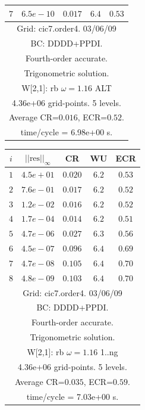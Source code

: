 \begin{table}[hbt]
\begin{center}
{\begin{tabular}{|c|c|c|c|c|}
 $ 7$  & $ 6.5e-10$ & $0.017$ & $ 6.4$ & $0.53$ \\ 
\hline 
\multicolumn{5}{|c|}{Grid: cic7.order4. 03/06/09}  \\
\multicolumn{5}{|c|}{BC: DDDD+PPDI.}  \\
\multicolumn{5}{|c|}{Fourth-order accurate.}  \\
\multicolumn{5}{|c|}{Trigonometric solution.}  \\
\multicolumn{5}{|c|}{W[2,1]: rb $\omega=1.16$ ALT}  \\
\multicolumn{5}{|c|}{4.36e+06 grid-points. 5 levels.}  \\
\multicolumn{5}{|c|}{Average CR=$0.016$, ECR=$0.52$.}  \\
\multicolumn{5}{|c|}{time/cycle = 6.98e+00 s.}  \\
\hline 
\end{tabular}
\begin{tabular}{|c|c|c|c|c|} \hline 
 $i$   & $\vert\vert\mbox{res}\vert\vert_\infty$  &  CR     &  WU    & ECR  \\   \hline 
 $ 1$  & $ 4.5e+01$ & $0.020$ & $ 6.2$ & $0.53$ \\ 
 $ 2$  & $ 7.6e-01$ & $0.017$ & $ 6.2$ & $0.52$ \\ 
 $ 3$  & $ 1.2e-02$ & $0.016$ & $ 6.2$ & $0.52$ \\ 
 $ 4$  & $ 1.7e-04$ & $0.014$ & $ 6.2$ & $0.51$ \\ 
 $ 5$  & $ 4.7e-06$ & $0.027$ & $ 6.3$ & $0.56$ \\ 
 $ 6$  & $ 4.5e-07$ & $0.096$ & $ 6.4$ & $0.69$ \\ 
 $ 7$  & $ 4.7e-08$ & $0.105$ & $ 6.4$ & $0.70$ \\ 
 $ 8$  & $ 4.8e-09$ & $0.103$ & $ 6.4$ & $0.70$ \\ 
\hline 
\multicolumn{5}{|c|}{Grid: cic7.order4. 03/06/09}  \\
\multicolumn{5}{|c|}{BC: DDDD+PPDI.}  \\
\multicolumn{5}{|c|}{Fourth-order accurate.}  \\
\multicolumn{5}{|c|}{Trigonometric solution.}  \\
\multicolumn{5}{|c|}{W[2,1]: rb $\omega=1.16$ 1..ng }  \\
\multicolumn{5}{|c|}{4.36e+06 grid-points. 5 levels.}  \\
\multicolumn{5}{|c|}{Average CR=$0.035$, ECR=$0.59$.}  \\
\multicolumn{5}{|c|}{time/cycle = 7.03e+00 s.}  \\

\end{tabular}}
\end{center}
\end{table}
